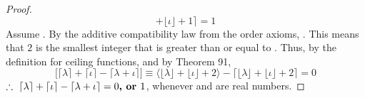 \documentclass[preview]{standalone}
\begin{document}
\begin{proof}
\begin{equation*}
                + 
            \lfloor \iota \rfloor 
                + 
            1
        \Big \rceil
            = 
        1
    \end{equation*} 
     Assume 
    . 
    By the additive compatibility law from the order axioms,
    . 
    This means that $2$ is the smallest integer that is greater than or equal to
    .
    Thus, by the definition for ceiling functions, 
    and by Theorem 91,
    \begin{equation*}
        \Big[ 
            \lceil \lambda \rceil 
                + 
            \lceil \iota \rceil 
                - 
            \lceil \lambda + \iota \rceil 
        \Big]
            \equiv
        \Big \langle \lfloor \lambda \rfloor + \lfloor \iota \rfloor + 2 \Big \rangle
            - 
        \Big \lceil
            \lfloor \lambda \rfloor 
                + 
            \lfloor \iota \rfloor 
                + 
            2
        \Big \rceil
            = 
        0
    \end{equation*} 
    $\therefore \text{\space} \relax{
        \lceil \lambda \rceil 
            + 
        \lceil \iota \rceil 
            - 
        \lceil \lambda + \iota \rceil 
            = 
        0
            \textbf{, or } 
        1
    }$, whenever \bm{$\lambda$} and \bm{$\iota$} are real 
    numbers.
\end{proof}
\end{document}
